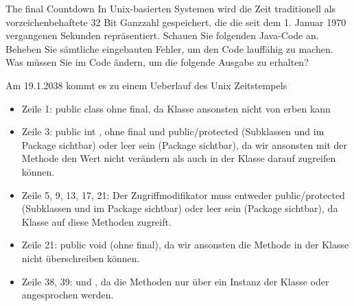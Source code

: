 \documentclass{../preamble}
\begin{document}
\begin{task}[credit = \stars{3}{3}]{The final Countdown}
    In Unix-basierten Systemen wird die Zeit traditionell als vorzeichenbehaftete 32 Bit Ganzzahl gespeichert, die die seit dem 1. Januar 1970 vergangenen Sekunden repräsentiert.
    \br
    Schauen Sie folgenden Java-Code an. Beheben Sie sämtliche eingebauten Fehler, um den Code lauffähig zu machen. Was müssen Sie im Code ändern, um die folgende Ausgabe zu erhalten?
    \br
    \begin{center}
        \textcolor{stringcolor}{\grqq Am 19.1.2038 kommt es zu einem Ueberlauf des Unix Zeitstempels\grqq}
    \end{center}

    \clearpage

    

    \clearpage

    \begin{solution}
        

        \clearpage

        \begin{itemize}
            \item Zeile 1: \textcolor{keywordcolor}{public class}  ohne \textcolor{keywordcolor}{final}, da Klasse  ansonsten nicht von  erben kann
            \item Zeile 3: \textcolor{keywordcolor}{public int} , ohne \textcolor{keywordcolor}{final} und \textcolor{keywordcolor}{public}/\textcolor{keywordcolor}{protected} (Subklassen und im Package sichtbar) oder leer sein (Package sichtbar), da wir ansonsten mit der Methode  den Wert nicht verändern als auch in der Klasse  darauf zugreifen können.
            \item Zeile 5, 9, 13, 17, 21: Der Zugriffmodifikator muss entweder \textcolor{keywordcolor}{public}/\textcolor{keywordcolor}{protected} (Subklassen und im Package sichtbar) oder leer sein (Package sichtbar), da Klasse  auf diese Methoden zugreift.
            \item Zeile 21: \textcolor{keywordcolor}{public void} (ohne \textcolor{keywordcolor}{final}), da wir ansonsten die Methode in der Klasse  nicht überschreiben können.
            \item Zeile 38, 39:  und , da die Methoden nur über ein Instanz der Klasse  oder  angesprochen werden.
        \end{itemize}
    \end{solution}
\end{task}
\end{document}
